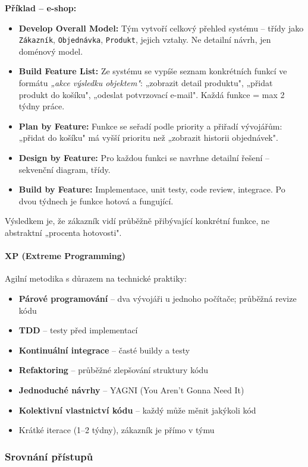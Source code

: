 \textbf{Příklad -- e-shop:}
\begin{itemize}
  \item \textbf{Develop Overall Model:} Tým vytvoří celkový přehled systému -- třídy jako \texttt{Zákazník}, \texttt{Objednávka}, \texttt{Produkt}, jejich vztahy. Ne detailní návrh, jen doménový model.
  \item \textbf{Build Feature List:} Ze systému se vypíše seznam konkrétních funkcí ve formátu \textit{„akce výsledku objektem"}: „zobrazit detail produktu", „přidat produkt do košíku", „odeslat potvrzovací e-mail". Každá funkce = max 2 týdny práce.
  \item \textbf{Plan by Feature:} Funkce se seřadí podle priority a přiřadí vývojářům: „přidat do košíku" má vyšší prioritu než „zobrazit historii objednávek".
  \item \textbf{Design by Feature:} Pro každou funkci se navrhne detailní řešení -- sekvenční diagram, třídy.
  \item \textbf{Build by Feature:} Implementace, unit testy, code review, integrace. Po dvou týdnech je funkce hotová a fungující.
\end{itemize}

Výsledkem je, že zákazník vidí průběžně přibývající konkrétní funkce, ne abstraktní „procenta hotovosti".

\paragraph{XP (Extreme Programming)}
Agilní metodika s důrazem na technické praktiky:
\begin{itemize}
  \item \textbf{Párové programování} -- dva vývojáři u jednoho počítače; průběžná revize kódu
  \item \textbf{TDD} -- testy před implementací
  \item \textbf{Kontinuální integrace} -- časté buildy a testy
  \item \textbf{Refaktoring} -- průběžné zlepšování struktury kódu
  \item \textbf{Jednoduché návrhy} -- YAGNI (You Aren't Gonna Need It)
  \item \textbf{Kolektivní vlastnictví kódu} -- každý může měnit jakýkoli kód
  \item Krátké iterace (1--2 týdny), zákazník je přímo v týmu
\end{itemize}

\subsubsection{Srovnání přístupů}

